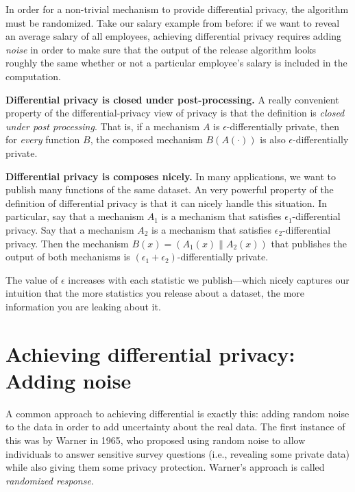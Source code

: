 \documentclass[
  letterpaper,
]{scrbook}
\theoremstyle{definition}
\theoremstyle{plain}
\theoremstyle{plain}
\theoremstyle{remark}
\begin{document}
In order for a non-trivial mechanism to provide differential privacy,
the algorithm must be randomized. Take our salary example from before:
if we want to reveal an average salary of all employees, achieving
differential privacy requires adding \emph{noise} in order to make sure
that the output of the release algorithm looks roughly the same whether
or not a particular employee's salary is included in the computation.

\textbf{Differential privacy is closed under post-processing.} A really
convenient property of the differential-privacy view of privacy is that
the definition is \emph{closed under post processing}. That is, if a
mechanism \(A\) is \(\epsilon\)-differentially private, then for
\emph{every} function \(B\), the composed mechanism \(B(A(\cdot))\) is
also \(\epsilon\)-differentially private.

\textbf{Differential privacy is composes nicely.} In many applications,
we want to publish many functions of the same dataset. An very powerful
property of the definition of differential privacy is that it can nicely
handle this situation. In particular, say that a mechanism \(A_1\) is a
mechanism that satisfies \(\epsilon_1\)-differential privacy. Say that a
mechanism \(A_2\) is a mechanism that satisfies
\(\epsilon_2\)-differential privacy. Then the mechanism
\(B(x) = (A_1(x) \| A_2(x))\) that publishes the output of both
mechanisms is \((\epsilon_1 + \epsilon_2)\)-differentially private.


The value of \(\epsilon\) increases with each statistic we
publish---which nicely captures our intuition that the more statistics
you release about a dataset, the more information you are leaking about
it.

\section{Achieving differential privacy: Adding
noise}\label{achieving-differential-privacy-adding-noise}

A common approach to achieving differential is exactly this: adding
random noise to the data in order to add uncertainty about the real
data. The first instance of this was by Warner in 1965, who proposed
using random noise to allow individuals to answer sensitive survey
questions (i.e., revealing some private data) while also giving them
some privacy protection. Warner's approach is called \emph{randomized
response}.
\end{document}
